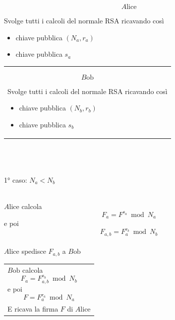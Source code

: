 \documentclass[a4paper,12pt, oneside]{book}
\begin{document}
			\begin{minipage}{0.45\textwidth}
				
				$$A\mbox{lice}$$\linebreak[2]
				
				Svolge tutti i calcoli del normale RSA ricavando così
				\begin{itemize}
					\item chiave pubblica $(N_a, r_a)$
					\item chiave pubblica $s_a$
				\end{itemize}
								
			\end{minipage}%
			\hfill
			\begin{minipage}{0.45\textwidth}
				\begin{tabular}{|p{\textwidth}}
					
					$$B\mbox{ob}$$\linebreak[2]
					
					Svolge tutti i calcoli del normale RSA ricavando così
					\begin{itemize}
						\item chiave pubblica $(N_b, r_b)$
						\item chiave pubblica $s_b$
					\end{itemize}
					
				\end{tabular}
			\end{minipage}\\\\\\%
			
			1° caso: $N_a < N_b$\\\\
			\begin{minipage}{0.45\textwidth}
				$A\mbox{lice}$ calcola 
				$$F_a = F^{s_a} \bmod N_a$$
				e poi
				$$F_{a,b} = F_{a}^{r_{b}} \bmod N_{b}$$\\
				$A\mbox{lice}$ spedisce $F_{a,b}$ a $B\mbox{ob}$
			\end{minipage}%
			\hfill
			\begin{minipage}{0.45\textwidth}
				\begin{tabular}{|p{\textwidth}}
					$B\mbox{ob}$ calcola 
					$$F_{a} = F_{a,b}^{s_{b}} \bmod N_{b}$$
					e poi
					$$F = F_a^{r_a} \bmod N_a$$\\
					E ricava la firma $F$ di $A\mbox{lice}$
				\end{tabular}
			\end{minipage}\\\\\\%
			
\end{document}
